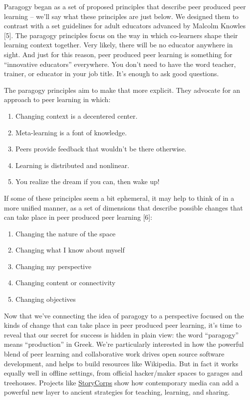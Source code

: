 Paragogy began as a set of proposed principles that describe peer
produced peer learning -- we'll say what these principles are just
below. We designed them to contrast with a set guidelines for adult
educators advanced by Malcolm Knowles {[}5{]}. The paragogy principles
focus on the way in which co-learners shape their learning context
together. Very likely, there will be no educator anywhere in sight. And
just for this reason, peer produced peer learning is something for
``innovative educators'' everywhere. You don't need to have the word
teacher, trainer, or educator in your job title. It's enough to ask good
questions.

The paragogy principles aim to make that more explicit. They advocate
for an approach to peer learning in which:

\begin{enumerate}
\item
  Changing context is a decentered center.
\item
  Meta-learning is a font of knowledge.
\item
  Peers provide feedback that wouldn't be there otherwise.
\item
  Learning is distributed and nonlinear.
\item
  You realize the dream if you can, then wake up!
\end{enumerate}
If some of these principles seem a bit ephemeral, it may help to think
of in a more unified manner, as a set of dimensions that describe
possible changes that can take place in peer produced peer learning
{[}6{]}:

\begin{enumerate}
\item
  Changing the nature of the space
\item
  Changing what I know about myself
\item
  Changing my perspective
\item
  Changing content or connectivity
\item
  Changing objectives
\end{enumerate}
Now that we've connecting the idea of paragogy to a perspective focused
on the kinds of change that can take place in peer produced peer
learning, it's time to reveal that our secret for success is hidden in
plain view: the word ``paragogy'' means ``production'' in Greek. We're
particularly interested in how the powerful blend of peer learning and
collaborative work drives open source software development, and helps to
build resources like Wikipedia. But in fact it works equally well in
offline settings, from official hacker/maker spaces to garages and
treehouses. Projects like
\href{http://storycorps.org/about/}{StoryCorps} show how contemporary
media can add a powerful new layer to ancient strategies for teaching,
learning, and sharing.

